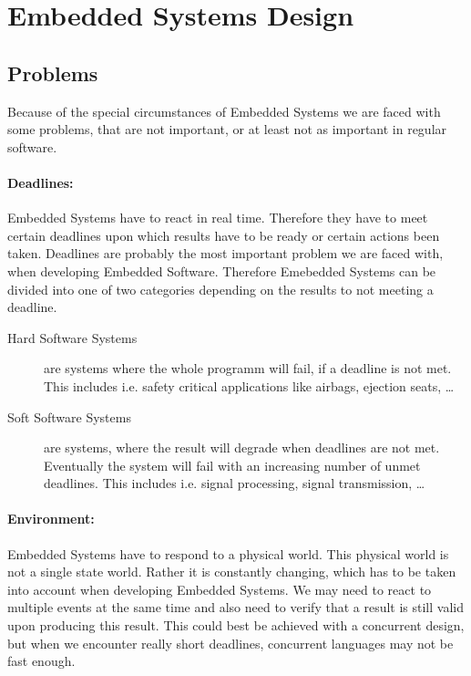 \documentclass[10pt,a4paper,titlepage,draft]{article} %
\begin{document}

\section{Embedded Systems Design}
\subsection{Problems}
Because of the special circumstances of Embedded Systems we are faced with some problems, that are not important, or at least not as important in regular software.

\paragraph{Deadlines:}
Embedded Systems have to react in real time.
Therefore they have to meet certain deadlines upon which results have to be ready or certain actions been taken.
Deadlines are probably the most important problem we are faced with, when developing Embedded Software.
Therefore Emebedded Systems can be divided into one of two categories depending on the results to not meeting a deadline.

\begin{description}
	\item[Hard Software Systems] are systems where the whole programm will fail, if a deadline is not met.
	This includes i.e. safety critical applications like airbags, ejection seats, \dots
	\item[Soft Software Systems] are systems, where the result will degrade when deadlines are not met.
	Eventually the system will fail with an increasing number of unmet deadlines. This includes i.e. signal processing, signal transmission, \dots
\end{description}

\paragraph{Environment:}
Embedded Systems have to respond to a physical world. This physical world is not a single state world.
Rather it is constantly changing, which has to be taken into account when developing Embedded Systems.
We may need to react to multiple events at the same time and also need to verify that a result is still valid upon producing this result.
This could best be achieved with a concurrent design, but when we encounter really short deadlines, concurrent languages may not be fast enough.
\end{document}
